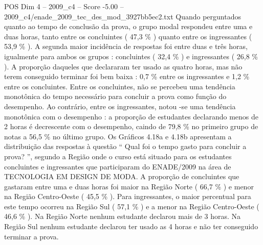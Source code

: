 \begin{textsample}{POS Dim 4 – 2009\_c4 – Score -5.00 – 2009\_c4/enade\_2009\_tec\_des\_mod\_3927bb5ec2.txt}
Quando perguntados quanto ao tempo de conclusão da prova, o grupo modal respondeu entre uma e duas horas, tanto entre os concluintes ( 47,3 \% ) quanto entre os ingressantes ( 53,9 \% ).
A segunda maior incidência de respostas foi entre duas e três horas, igualmente para ambos os grupos : concluintes ( 32,4 \% ) e ingressantes ( 26,8 \% ).
A proporção daqueles que declararam ter usado as quatro horas, mas não terem conseguido terminar foi bem baixa : 0,7 \% entre os ingressantes e 1,2 \% entre os concluintes.
Entre os concluintes, não se percebeu uma tendência monotônica do tempo necessário para concluir a prova como função do desempenho.
Ao contrário, entre os ingressantes, notou -se uma tendência monotônica com o desempenho : a proporção de estudantes declarando menos de 2 horas é decrescente com o desempenho, caindo de 79,8 \% no primeiro grupo de notas a 56,5 \% no último grupo.
Os Gráficos 4.18a e 4.18b apresentam a distribuição das respostas à questão “ Qual foi o tempo gasto para concluir a prova? ”, segundo a Região onde o curso está situado para os estudantes concluintes e ingressantes que participaram do ENADE/2009 na área de TECNOLOGIA EM DESIGN DE MODA.
A proporção de concluintes que gastaram entre uma e duas horas foi maior na Região Norte ( 66,7 \% ) e menor na Região Centro-Oeste ( 45,5 \% ).
Para ingressantes, o maior percentual para este tempo ocorreu na Região Sul ( 57,1 \% ) e a menor na Região Centro-Oeste ( 46,6 \% ).
Na Região Norte nenhum estudante declarou mais de 3 horas.
Na Região Sul nenhum estudante declarou ter usado as 4 horas e não ter conseguido terminar a prova.

\end{textsample}
